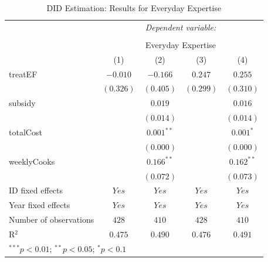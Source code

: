 \documentclass[12pt, a4paper, titlepage]{article}\usepackage[]{graphicx}\usepackage[]{color}
\begin{document}
\begin{table}
\begin{center}
\begin{tabular}{l c c c c}
\\[-1.8ex]\hline
& \multicolumn{4}{c}{\textit{Dependent variable:}} \\
\cline{2-5}
\\[-1.8ex] & \multicolumn{4}{c}{Everyday Expertise} \\
\hline
 & (1) & (2) & (3) & (4) \\
\hline
treatEF                & $-0.010$  & $-0.166$     & $0.247$   & $0.255$      \\
                       & $(0.326)$ & $(0.405)$    & $(0.299)$ & $(0.310)$    \\
subsidy                &           & $0.019$      &           & $0.016$      \\
                       &           & $(0.014)$    &           & $(0.014)$    \\
totalCost              &           & $0.001^{**}$ &           & $0.001^{*}$  \\
                       &           & $(0.000)$    &           & $(0.000)$    \\
weeklyCooks            &           & $0.166^{**}$ &           & $0.162^{**}$ \\
                       &           & $(0.072)$    &           & $(0.073)$    \\
\hline
ID fixed effects       & $Yes$     & $Yes$        & $Yes$     & $Yes$        \\
Year fixed effects     & $Yes$     & $Yes$        & $Yes$     & $Yes$        \\
Number of observations & $428$     & $410$        & $428$     & $410$        \\
R$^2$                  & $0.475$   & $0.490$      & $0.476$   & $0.491$      \\
\hline
\multicolumn{5}{l}{\scriptsize{$^{***}p<0.01$; $^{**}p<0.05$; $^{*}p<0.1$}}
\end{tabular}
\caption{DID Estimation: Results for Everyday Expertise}
\label{table:coefficients1}
\end{center}
\end{table}
\end{document}
